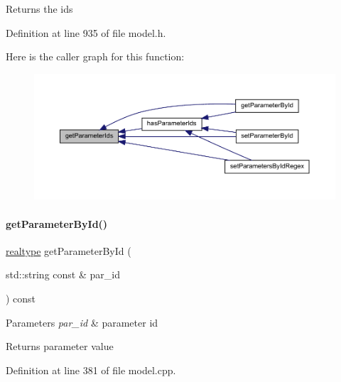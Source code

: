 \begin{DoxyReturn}{Returns}
the ids 
\end{DoxyReturn}


Definition at line 935 of file model.\+h.

Here is the caller graph for this function\+:
\nopagebreak
\begin{figure}[H]
\begin{center}
\leavevmode
\includegraphics[width=350pt]{classamici_1_1_model_ad5647cbe7c4989a7692955cbdbf5b3cd_icgraph}
\end{center}
\end{figure}
\mbox{\label{classamici_1_1_model_a4436bd89ae2cb032cbf13db478d99e15}} 
\paragraph{\texorpdfstring{get\+Parameter\+By\+Id()}{getParameterById()}}
{\footnotesize\ttfamily \mbox{\hyperlink{namespaceamici_a1bdce28051d6a53868f7ccbf5f2c14a3}{realtype}} get\+Parameter\+By\+Id (\begin{DoxyParamCaption}\item[{std\+::string const \&}]{par\+\_\+id }\end{DoxyParamCaption}) const}


\begin{DoxyParams}{Parameters}
{\em par\+\_\+id} & parameter id \\
\hline
\end{DoxyParams}
\begin{DoxyReturn}{Returns}
parameter value 
\end{DoxyReturn}


Definition at line 381 of file model.\+cpp.

